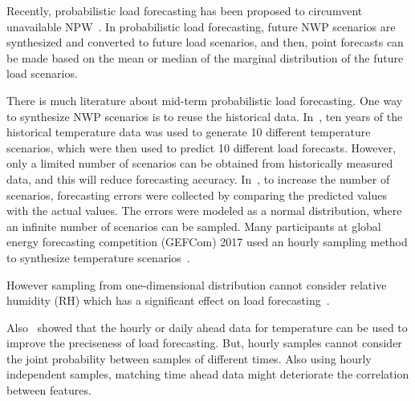 \documentclass[journal]{IEEEtran} %
\begin{document}
Recently, probabilistic load forecasting has been proposed to circumvent unavailable NPW~\cite{xie2016temperature}. In probabilistic load forecasting, future NWP scenarios are synthesized and converted to future load scenarios, and then, point forecasts can be made based on the mean or median of the marginal distribution of the future load scenarios.


There is much literature about mid-term probabilistic load forecasting. One way to synthesize NWP scenarios is to reuse the historical data. In~\cite{Tao2014}, ten years of the historical temperature data was used to generate 10 different temperature scenarios, which were then used to predict 10 different load forecasts. However, only a limited number of scenarios can be obtained from historically measured data, and this will reduce forecasting accuracy. In~\cite{Jingrui2015}, to increase the number of scenarios, forecasting errors were collected by comparing the predicted values with the actual values. The errors were modeled as a normal distribution, where an infinite number of scenarios can be sampled.  Many participants at global energy forecasting competition  (GEFCom) 2017 used an hourly sampling method to synthesize temperature scenarios~\cite{hong2019global}. 

However sampling from one-dimensional distribution cannot consider relative humidity (RH) which has a significant effect on load forecasting~\cite{xie2016relative}. 

Also~\cite{xie2017variable} showed that the hourly or daily ahead data for temperature can be used to improve the preciseness of load forecasting. But, hourly samples cannot consider the joint probability between samples of different times. Also using hourly independent samples, matching time ahead data might deteriorate the correlation between features.  
\end{document}
